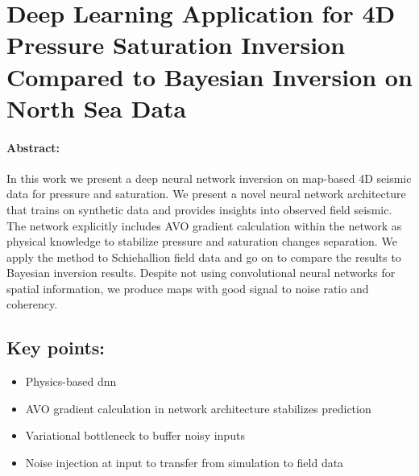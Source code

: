 \section{Deep Learning Application for 4D Pressure Saturation Inversion Compared to Bayesian Inversion on North Sea Data}

\paragraph{Abstract:} In this work we present a deep neural network inversion on map-based 4D seismic data for pressure and saturation. We present a novel neural network architecture that trains on synthetic data and provides insights into observed field seismic. The network explicitly includes AVO gradient calculation within the network as physical knowledge to stabilize pressure and saturation changes separation. We apply the method to Schiehallion field data and go on to compare the results to Bayesian inversion results. Despite not using convolutional neural networks for spatial information, we produce maps with good signal to noise ratio and coherency.
\vfill
\subsection*{Key points:}
\begin{itemize}
    \item Physics-based \acl{dnn}
    \item AVO gradient calculation in network architecture stabilizes prediction
    \item Variational bottleneck to buffer noisy inputs
    \item Noise injection at input to transfer from simulation to field data
\end{itemize}
\vfill
{\vfill\hfill\newline{}}


